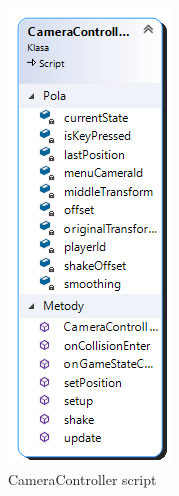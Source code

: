 \documentclass[12pt, english]{article}
\begin{document}
\begin{figure}
	\centering
	\includegraphics[width=\textwidth, height=0.9\textheight, keepaspectratio]{image3.png}
	\caption{CameraController script}
	\label{figure_cameracontrollerscript}
\end{figure}
\end{document}
